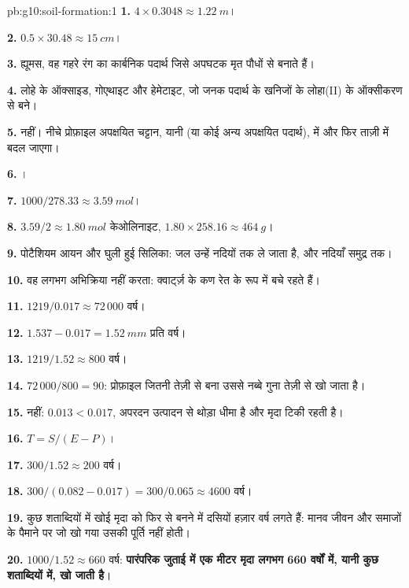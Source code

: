 \begin{solution}{pb:g10:soil-formation:1}
\textbf{1.} $4 \times 0.3048 \approx \qty{1.22}{m}$।

\textbf{2.} $0.5 \times 30.48 \approx \qty{15}{cm}$।

\textbf{3.} ह्यूमस, वह गहरे रंग का कार्बनिक पदार्थ जिसे अपघटक मृत
पौधों से बनाते हैं।

\textbf{4.} लोहे के ऑक्साइड, गोएथाइट और हेमेटाइट, जो जनक पदार्थ के खनिजों के
लोहा(II) के ऑक्सीकरण से बने।

\textbf{5.} नहीं। नीचे प्रोफ़ाइल अपक्षयित चट्टान, यानी
 (या कोई अन्य अपक्षयित पदार्थ), में और फिर ताज़ी  में बदल जाएगा।

\textbf{6.} ।

\textbf{7.} $1000/278.33 \approx \qty{3.59}{mol}$।

\textbf{8.} $3.59/2 \approx \qty{1.80}{mol}$ केओलिनाइट, $1.80 \times 258.16
\approx \qty{464}{g}$।

\textbf{9.} पोटैशियम आयन और घुली हुई सिलिका: जल उन्हें नदियों तक ले जाता है,
और नदियाँ समुद्र तक।

\textbf{10.} वह लगभग अभिक्रिया नहीं करता: क्वार्ट्ज़ के कण रेत के रूप में बचे रहते हैं।

\textbf{11.} $1219/0.017 \approx 72\,000$ वर्ष।

\textbf{12.} $1.537 - 0.017 = \qty{1.52}{mm}$ प्रति वर्ष।

\textbf{13.} $1219/1.52 \approx 800$ वर्ष।

\textbf{14.} $72\,000/800 = 90$: प्रोफ़ाइल जितनी तेज़ी से बना उससे नब्बे गुना तेज़ी से
खो जाता है।

\textbf{15.} नहीं: $0.013 < 0.017$, अपरदन उत्पादन से थोड़ा धीमा है
और मृदा टिकी रहती है।

\textbf{16.} $T = S/(E - P)$।

\textbf{17.} $300/1.52 \approx 200$ वर्ष।

\textbf{18.} $300/(0.082 - 0.017) = 300/0.065 \approx 4600$ वर्ष।

\textbf{19.} कुछ शताब्दियों में खोई मृदा को फिर से बनने में दसियों हज़ार वर्ष
लगते हैं: मानव जीवन और समाजों के पैमाने पर जो खो गया उसकी
पूर्ति नहीं होती।

\textbf{20.} $1000/1.52 \approx 660$ वर्ष: \textbf{पारंपरिक जुताई में एक मीटर मृदा
लगभग 660 वर्षों में, यानी कुछ शताब्दियों में, खो जाती है}।
\end{solution}
